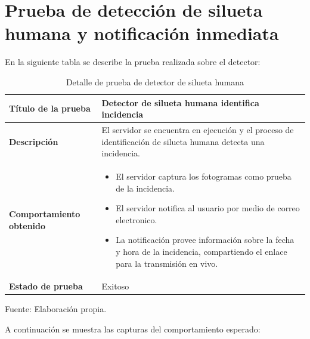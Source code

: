 \section{Prueba de detección de silueta humana y notificación inmediata}

En la siguiente tabla se describe la prueba realizada sobre el detector:

\begin{table}[H]
    \caption{Detalle de prueba de detector de silueta humana}
    \begin{center}
        \begin{tabular}{|>{\centering}p{}|m{}<{\centering}|} 
            \hline
            \textbf{Título de la prueba} & Detector de silueta humana identifica incidencia \\
            \hline
            \textbf{Descripción} & El servidor se encuentra en ejecución y el proceso de identificación de silueta humana detecta una incidencia.\\
            \hline
            \textbf{Comportamiento obtenido} & 
            \begin{itemize}
                \item El servidor captura los fotogramas como prueba de la incidencia.
                \item El servidor notifica al usuario por medio de correo electronico.
                \item La notificación provee información sobre la fecha y hora de la incidencia, compartiendo el enlace para la transmisión en vivo.
            \end{itemize} \\ 
            \hline
            \textbf{Estado de prueba} & Exitoso \\
            \hline
        \end{tabular}
    \end{center}
    \begin{center}
        Fuente: Elaboración propia.
    \end{center}
\end{table}

A continuación se muestra las capturas del comportamiento esperado:

